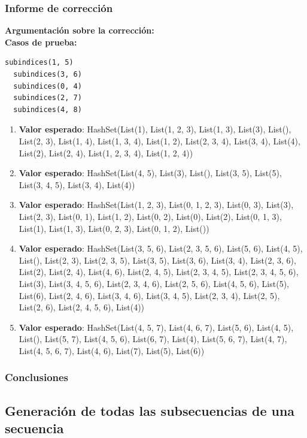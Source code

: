 \documentclass[12pt, a4paper]{article}
\begin{document}
\subsubsection{Informe de corrección}
\textbf{Argumentación sobre la corrección: \\}
\textbf{Casos de prueba: \\}
\begin{lstlisting}[caption=Casos de prueba para la función subindices, label=lst:scala_code]
  subindices(1, 5)
  subindices(3, 6)
  subindices(0, 4)
  subindices(2, 7)
  subindices(4, 8)
\end{lstlisting}
\begin{enumerate}
  \item \textbf{Valor esperado}: HashSet(List(1), List(1, 2, 3), List(1, 3), List(3), List(), List(2, 3), List(1, 4), List(1, 3, 4), List(1, 2), List(2, 3, 4), List(3, 4), List(4), List(2), List(2, 4), List(1, 2, 3, 4), List(1, 2, 4))
  \item \textbf{Valor esperado}: HashSet(List(4, 5), List(3), List(), List(3, 5), List(5), List(3, 4, 5), List(3, 4), List(4))
  \item \textbf{Valor esperado}: HashSet(List(1, 2, 3), List(0, 1, 2, 3), List(0, 3), List(3), List(2, 3), List(0, 1), List(1, 2), List(0, 2), List(0), List(2), List(0, 1, 3), List(1), List(1, 3), List(0, 2, 3), List(0, 1, 2), List())
  \item \textbf{Valor esperado}: HashSet(List(3, 5, 6), List(2, 3, 5, 6), List(5, 6), List(4, 5), List(), List(2, 3), List(2, 3, 5), List(3, 5), List(3, 6), List(3, 4), List(2, 3, 6), List(2), List(2, 4), List(4, 6), List(2, 4, 5), List(2, 3, 4, 5), List(2, 3, 4, 5, 6), List(3), List(3, 4, 5, 6), List(2, 3, 4, 6), List(2, 5, 6), List(4, 5, 6), List(5), List(6), List(2, 4, 6), List(3, 4, 6), List(3, 4, 5), List(2, 3, 4), List(2, 5), List(2, 6), List(2, 4, 5, 6), List(4))
  \item \textbf{Valor esperado}: HashSet(List(4, 5, 7), List(4, 6, 7), List(5, 6), List(4, 5), List(), List(5, 7), List(4, 5, 6), List(6, 7), List(4), List(5, 6, 7), List(4, 7), List(4, 5, 6, 7), List(4, 6), List(7), List(5), List(6))
\end{enumerate}
\subsubsection{Conclusiones}
\subsection{Generación de todas las subsecuencias de una secuencia}
\end{document}
